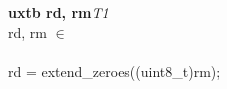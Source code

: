 


\begin{instructionblock}{\imagewidth}%
    \textbf{uxtb rd, rm}\hfill\textit{T1}\\
    rd, rm $\in$ \baseregisters\\
    {}\\
    rd = extend\_zeroes((uint8\_t)rm);
\end{instructionblock}

